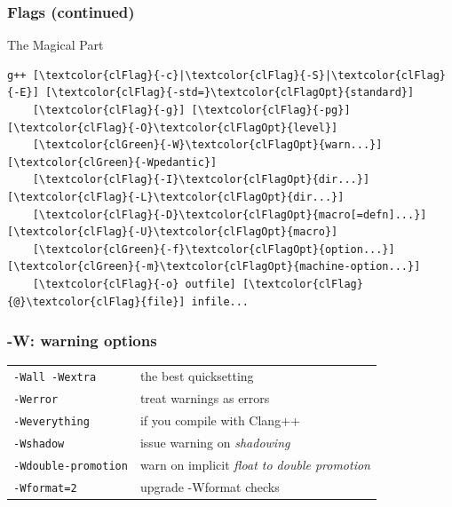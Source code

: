 \documentclass[aspectratio=169]{beamer}
\begin{document}
\begin{frame}[fragile]
\frametitle{Flags (continued)}
\centering
\begin{center}{\huge {\color{clGreen}The Magical Part}}\end{center}
\vspace{1ex}
\begin{BVerbatim}[commandchars=\\\{\}]
g++ [\textcolor{clFlag}{-c}|\textcolor{clFlag}{-S}|\textcolor{clFlag}{-E}] [\textcolor{clFlag}{-std=}\textcolor{clFlagOpt}{standard}]
    [\textcolor{clFlag}{-g}] [\textcolor{clFlag}{-pg}] [\textcolor{clFlag}{-O}\textcolor{clFlagOpt}{level}]
    [\textcolor{clGreen}{-W}\textcolor{clFlagOpt}{warn...}] [\textcolor{clGreen}{-Wpedantic}]
    [\textcolor{clFlag}{-I}\textcolor{clFlagOpt}{dir...}] [\textcolor{clFlag}{-L}\textcolor{clFlagOpt}{dir...}]
    [\textcolor{clFlag}{-D}\textcolor{clFlagOpt}{macro[=defn]...}] [\textcolor{clFlag}{-U}\textcolor{clFlagOpt}{macro}]
    [\textcolor{clGreen}{-f}\textcolor{clFlagOpt}{option...}] [\textcolor{clGreen}{-m}\textcolor{clFlagOpt}{machine-option...}]
    [\textcolor{clFlag}{-o} outfile] [\textcolor{clFlag}{@}\textcolor{clFlag}{file}] infile...
\end{BVerbatim}
\end{frame}


\begin{frame}
\frametitle{-W: warning options}
\begin{table}
\begin{tabular}{l l}
\toprule
\texttt{\textcolor{clGreen}{-W}all \textcolor{clGreen}{-W}extra} &
the best quicksetting \\ [2ex]
\texttt{\textcolor{clGreen}{-W}error} & treat warnings as errors \\ [2ex]
\texttt{\textcolor{clGreen}{-W}everything} & if you compile with Clang++ \\ [2ex]
\midrule
\texttt{\textcolor{clGreen}{-W}shadow} & issue warning on \textit{shadowing} \\ [2ex]
\texttt{\textcolor{clGreen}{-W}double-promotion} &
warn on implicit \textit{float to double promotion} \\ [2ex]
\texttt{\textcolor{clGreen}{-W}format=2} & upgrade -Wformat checks \\ [2ex]
\bottomrule
\end{tabular}
\end{table}
\end{frame}
\end{document}
